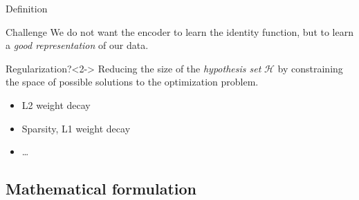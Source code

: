\documentclass[handout]{beamer}
\begin{document}
  \begin{frame}{Definition}


    \begin{alertblock}{Challenge}
      We do not want the encoder to learn the identity function, but to learn a \emph{good representation} of our data.
    \end{alertblock}

    \vspace{0.5cm}
    \pause

    \begin{block}{Regularization?}<2->
      Reducing the size of the \emph{hypothesis set} $\mathcal{H}$ by constraining the space of possible solutions to the optimization problem.
      \vspace{-0.25cm}
      \begin{itemize}
        \item L2 weight decay
        \item Sparsity, L1 weight decay
        \item \dots
      \end{itemize}
    \end{block}
    
  \end{frame}

  \subsection{Mathematical formulation}
\end{document}

